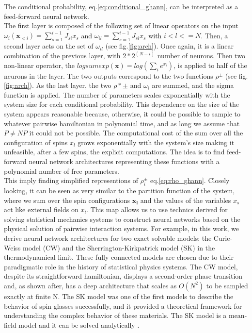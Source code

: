\documentclass[aps,physrev,10pt,floatfix,longbibliography,nofootinbib,reprint]{revtex4-2}
\begin{document}
The conditional probability, eq.\ref{eq:conditional_ghann}, can be interpreted as a feed-forward neural network. \\
The first layer is composed of the following set of linear operators on the input $\omega_i(\mathbf{x}_{<i})=\sum_{s=1}^{i-1} J_{si} x_s$ and $\omega_{il}=\sum_{s=1}^{i-1} J_{sl} x_s$ with $i<l<=N$. 
Then, a second layer acts on the set of $\omega_{il}$ (see fig.\ref{fig:arch}). Once again, it is a linear combination of the previous layer, with $2*2^{(N-i)}$ number of neurons. Then two non-linear operator, the $logsumexp(\mathbf{x}) = log(\sum_i e^{x_i})$, is applied to half of the neurons in the layer. The two outputs correspond to the two functions $\rho^{\pm}$ (see fig.\ref{fig:arch}). As the last layer, the two $\rho*{\pm}$ and $\omega_i$ are summed, and the sigma function is applied. The number of parameters scales exponentially with the system size for each conditional probability. This dependence on the size of the system appears reasonable because, otherwise, it could be possible to sample to whatever pairwise hamiltonian in polynomial time, and as long we assume that $P\neq NP$ it could not be possible. 
The computational cost of the sum over all the configuration of spins $x_l$ grows exponentially with the system's size making it unfeasible, after a few spins, the explicit computations. The idea is to find feed-forward neural network architectures representing these functions with a polynomial number of free parameters. \\
This imply finding simplified representions of $\rho_i^{\pm}$ eq.\ref{eq:rho_ghann}. Closely looking, it can be seen as very similar to the partition function of the system, where we sum over the spin configurations $\mathbf{x_l}$ and the values of the variables $x_s$ act like external fields on $x_l$.
This map allows us to use technics derived for solving statistical mechanics systems to construct neural networks based on the physical solution of pairwise interaction systems. For example, in this work, we derive neural network architectures for two exact solvable models: the Curie-Weiss model (CW) and the Sherrington-Kirkpatrick model (SK) in the thermodynamical limit. These fully connected models are chosen due to their paradigmatic role in the history of statistical physics systems. The CW model, despite its straightforward hamiltonian, displays a second-order phase transition and, as shown after, has a deep architecture that scales as $O(N^2)$ to be sampled exactly at finite N. The SK model was one of the first models to describe the behavior of spin glasses successfully, and it provided a theoretical framework for understanding the complex behavior of these materials. The SK model is a mean-field model and it can be solved analytically \cite{}.  
\end{document}

